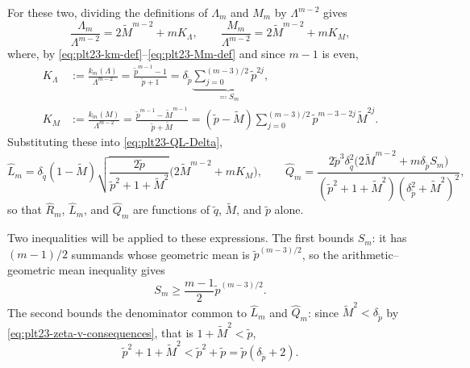 ﻿\documentclass[11pt]{article}
\numberwithin{equation}{section}
\begin{document}
For these two, dividing the definitions of $\Lambda_m$ and $M_m$ by $\Lambda^{m-2}$ gives
\begin{equation}\label{eq:plt23-coeff-norm}
  \frac{\Lambda_m}{\Lambda^{m-2}}=2\tilde M^{m-2}+mK_\Lambda,
  \qquad
  \frac{M_m}{\Lambda^{m-2}}=2\tilde M^{m-2}+mK_M,
\end{equation}
where, by \eqref{eq:plt23-km-def}--\eqref{eq:plt23-Mm-def} and since $m-1$ is even,
\begin{align}
  K_\Lambda
  &:=\frac{k_m(\Lambda)}{\Lambda^{m-2}}
    =\frac{\tilde p^{m-1}-1}{\tilde p+1}
    =\delta_{\tilde p}
     \underbrace{\sum_{j=0}^{(m-3)/2}\tilde p^{2j}}_{\eqqcolon S_m},
  \label{eq:plt23-KA-def}\\
  K_M
  &:=\frac{k_m(M)}{\Lambda^{m-2}}
    =\frac{\tilde p^{m-1}-\tilde M^{m-1}}{\tilde p+\tilde M}
    =(\tilde p-\tilde M)
     \sum_{j=0}^{(m-3)/2}
       \tilde p^{m-3-2j}\tilde M^{2j}.
  \label{eq:plt23-KL-def}
\end{align}
Substituting these into \eqref{eq:plt23-QL-Delta},
\[
  \widehat L_m
  =\delta_{\tilde q}(1-\tilde M)
   \sqrt{\frac{2\tilde p}{\tilde p^2+1+\tilde M^2}}
   \bigl(2\tilde M^{m-2}+mK_M\bigr),
  \qquad
  \widehat Q_m
  =\frac{2\tilde p^3\delta_{\tilde q}^2
         \bigl(2\tilde M^{m-2}+m\delta_{\tilde p}S_m\bigr)}
        {(\tilde p^2+1+\tilde M^2)(\delta_{\tilde p}^2+\tilde M^2)^2},
\]
so that $\widehat R_m$, $\widehat L_m$, and $\widehat Q_m$ are functions of $\tilde q$, $\tilde M$, and $\tilde p$ alone.

Two inequalities will be applied to these expressions.
The first bounds $S_m$: it has $(m-1)/2$ summands whose geometric mean is $\tilde p^{(m-3)/2}$, so the arithmetic--geometric mean inequality gives
\begin{equation}\label{eq:plt23-SN-AMGM}
  S_m\ge \frac{m-1}{2}\tilde p^{(m-3)/2}.
\end{equation}
The second bounds the denominator common to $\widehat L_m$ and $\widehat Q_m$: since $\tilde M^2<\delta_{\tilde p}$ by \eqref{eq:plt23-zeta-v-consequences}, that is $1+\tilde M^2<\tilde p$,
\begin{equation}\label{eq:plt23-Delta-upper-sigma}
  \tilde p^2+1+\tilde M^2<\tilde p^2+\tilde p=\tilde p(\delta_{\tilde p}+2).
\end{equation}
\end{document}

